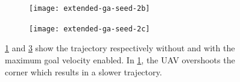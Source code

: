 \begin{figure}
	\centering
	\begin{subfigure}[t]{0.30\columnwidth}
        		\texttt{[image: extended-ga-seed-2b]}
        		\caption{}
        		 \label{fig:ga-seed-nomaxvelb}
	\end{subfigure}	
	\hfill
	\begin{subfigure}[t]{0.30\columnwidth}
        		\texttt{[image: extended-ga-seed-2c]}
        		\caption{}
        		 \label{fig:ga-seed-maxvel}
	\end{subfigure}		
	\caption[A demonstration of why stop points should only be used with a maximum goal velocity.]{ \ref{fig:ga-seed-nomaxvelb} and \ref{fig:ga-seed-maxvel} show the trajectory respectively without and with the maximum goal velocity enabled. In \ref{fig:ga-seed-nomaxvelb}, the UAV overshoots the corner which results in a slower trajectory.}
    \label{fig:ga-seed-maxvel}     
\end{figure}


